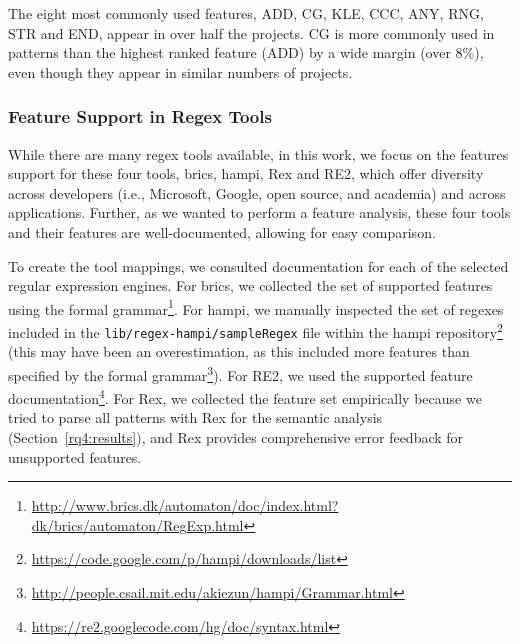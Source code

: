 The eight most commonly used features, ADD, CG, KLE, CCC, ANY, RNG, STR and END,
appear in over half the projects. %
CG is more commonly used in patterns than the highest ranked feature (ADD) by a wide margin (over 8\%), even though they appear in similar numbers of projects. 

\subsubsection{Feature Support in Regex Tools}
\label{regextoolsresults}
While there are many regex tools available, in this work, we focus on the features support for these four tools, brics, hampi, Rex and RE2, which offer diversity across developers (i.e., Microsoft, Google, open source, and academia) and across applications. Further, as we wanted to perform a feature analysis, these four tools and their features are well-documented, allowing for easy comparison.

To create the tool mappings, we consulted documentation for each of the selected regular expression engines. For brics, we collected the set of supported features using the formal grammar\footnote{\url{http://www.brics.dk/automaton/doc/index.html?dk/brics/automaton/RegExp.html}}.  For hampi, we manually inspected the set of regexes included in the {\tt lib/regex-hampi/sampleRegex} file within the hampi repository\footnote{\url{https://code.google.com/p/hampi/downloads/list}} (this may have been an overestimation, as this included more features than specified by the formal grammar\footnote{\url{http://people.csail.mit.edu/akiezun/hampi/Grammar.html}}).  For RE2, we used the  supported feature documentation\footnote{\url{https://re2.googlecode.com/hg/doc/syntax.html}}.  For Rex, we collected the feature set empirically because we tried to parse all patterns with Rex for the semantic analysis (Section~\ref{rq4:results}), and Rex provides comprehensive error feedback for unsupported features.



